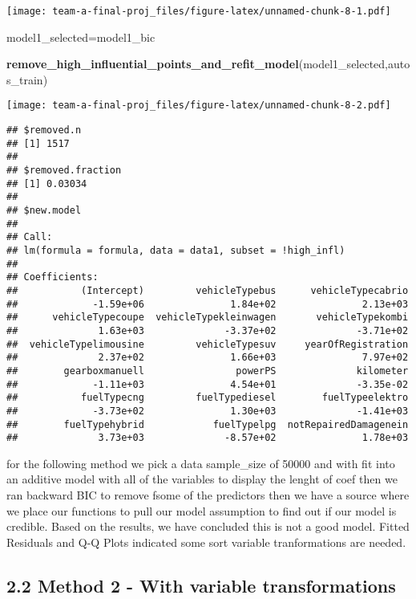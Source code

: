 \documentclass[]{article}
\newenvironment{Shaded}{\begin{snugshade}}{\end{snugshade}}
\newcommand{\KeywordTok}[1]{\textcolor[rgb]{0.13,0.29,0.53}{\textbf{#1}}}
\newcommand{\NormalTok}[1]{#1}
\begin{document}
\texttt{[image: team-a-final-proj\_files/figure-latex/unnamed-chunk-8-1.pdf]}

\begin{Shaded}
\begin{Highlighting}[]
\NormalTok{model1_selected=model1_bic}

\KeywordTok{remove_high_influential_points_and_refit_model}\NormalTok{(model1_selected,autos_train)}
\end{Highlighting}
\end{Shaded}

\texttt{[image: team-a-final-proj\_files/figure-latex/unnamed-chunk-8-2.pdf]}

\begin{verbatim}
## $removed.n
## [1] 1517
## 
## $removed.fraction
## [1] 0.03034
## 
## $new.model
## 
## Call:
## lm(formula = formula, data = data1, subset = !high_infl)
## 
## Coefficients:
##           (Intercept)         vehicleTypebus      vehicleTypecabrio  
##             -1.59e+06               1.84e+02               2.13e+03  
##      vehicleTypecoupe  vehicleTypekleinwagen       vehicleTypekombi  
##              1.63e+03              -3.37e+02              -3.71e+02  
##  vehicleTypelimousine         vehicleTypesuv     yearOfRegistration  
##              2.37e+02               1.66e+03               7.97e+02  
##        gearboxmanuell                powerPS              kilometer  
##             -1.11e+03               4.54e+01              -3.35e-02  
##           fuelTypecng         fuelTypediesel        fuelTypeelektro  
##             -3.73e+02               1.30e+03              -1.41e+03  
##        fuelTypehybrid            fuelTypelpg  notRepairedDamagenein  
##              3.73e+03              -8.57e+02               1.78e+03
\end{verbatim}

for the following method we pick a data sample\_size of 50000 and with
fit into an additive model with all of the variables to display the
lenght of coef then we ran backward BIC to remove fsome of the
predictors then we have a source where we place our functions to pull
our model assumption to find out if our model is credible. Based on the
results, we have concluded this is not a good model. Fitted Residuals
and Q-Q Plots indicated some sort variable tranformations are needed.

\hypertarget{method-2---with-variable-transformations}{%
\subsection{2.2 Method 2 - With variable
transformations}\label{method-2---with-variable-transformations}}
\end{document}
